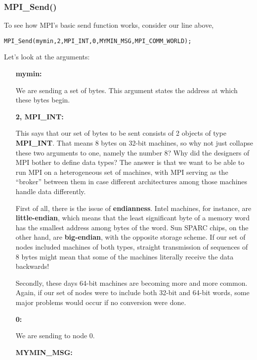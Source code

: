 \subsubsection{MPI\_Send()}

To see how MPI's basic send function works, consider our line above,

\begin{Verbatim}[fontsize=\relsize{-2}]
MPI_Send(mymin,2,MPI_INT,0,MYMIN_MSG,MPI_COMM_WORLD);
\end{Verbatim}

Let's look at the arguments:

\begin{itemize}

\item [{\bf mymin:}] 

We are sending a set of bytes.  This argument states the address at
which these bytes begin.

\item [{\bf 2, MPI\_INT:}]

This says that our set of bytes to be sent consists of 2 objects of type
{\bf MPI\_INT}.  That means 8 bytes on 32-bit machines, so why not just
collapse these two arguments to one, namely the number 8?  Why did the
designers of MPI bother to define data types?  The answer is that we
want to be able to run MPI on a heterogeneous set of machines, with MPI
serving as the ``broker'' between them in case different architectures
among those machines handle data differently.

First of all, there is the issue of {\bf endianness}.  Intel machines,
for instance, are {\bf little-endian}, which means that the least
significant byte of a memory word has the smallest address among bytes
of the word.  Sun SPARC chips, on the other hand, are {\bf big-endian},
with the opposite storage scheme.  If our set of nodes included machines
of both types, straight transmission of sequences of 8 bytes might mean
that some of the machines literally receive the data backwards!

Secondly, these days 64-bit machines are becoming more and more common.
Again, if our set of nodes were to include both 32-bit and 64-bit words,
some major problems would occur if no conversion were done.

\item [{\bf 0:}]

We are sending to node 0.

\item [{\bf MYMIN\_MSG:}]


\end{itemize}
